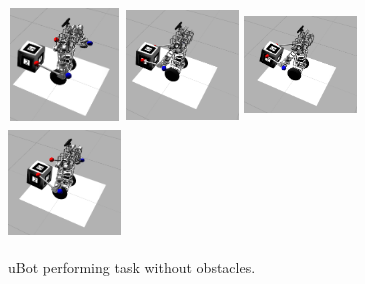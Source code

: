 \documentclass[a4paper]{article}
\begin{document}
\begin{figure}[!htb]
  \includegraphics[width=30mm, height=30mm]{normal11.png}
  \label{normal1}
\endminipage\hfill
{}
  \includegraphics[width=30mm, height=30mm]{normal21.png}
  \label{normal2}
\endminipage\hfill
{}%
  \includegraphics[width=30mm, height=30mm]{normal31.png}
  \label{normal3}
\endminipage\hfill
{}%
  \includegraphics[width=30mm, height=30mm]{normal41.png}
  \label{normal4}
\endminipage
\caption{uBot performing task without obstacles.}
\label{ubot_normal}
\end{figure}
\end{document}
